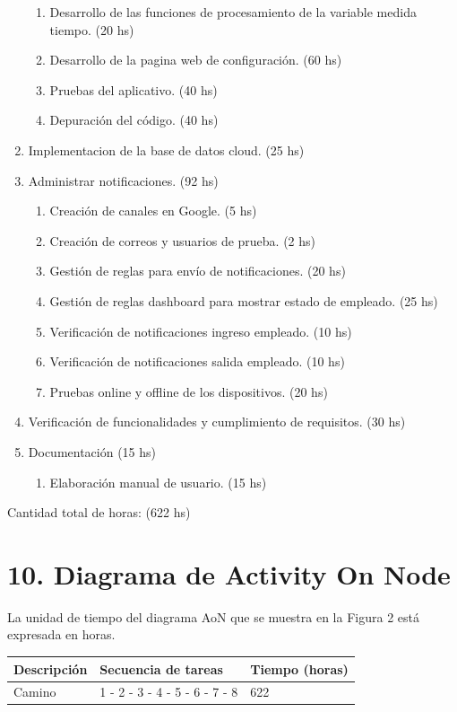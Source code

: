 \documentclass[
11pt, %
]{charter}
\begin{document}
\begin{enumerate}
\begin{enumerate}
	\item Desarrollo de las funciones de procesamiento de la variable medida tiempo. (20 hs)
	\item Desarrollo de la pagina web de configuración. (60 hs)
	\item Pruebas del aplicativo. (40 hs)
	\item Depuración del código. (40 hs)
	\end{enumerate}
\item Implementacion de la base de datos cloud. (25 hs)
\item Administrar notificaciones. (92 hs)
	\begin{enumerate}
	\item Creación de canales en Google. (5 hs)
	\item Creación de correos y usuarios de prueba. (2 hs)
	\item Gestión de reglas para envío de notificaciones. (20 hs)
	\item Gestión de reglas dashboard para mostrar estado de empleado. (25 hs)
	\item Verificación de notificaciones ingreso empleado. (10 hs)
	\item Verificación de notificaciones salida empleado. (10 hs)
	\item Pruebas online y offline de los dispositivos. (20 hs)
	\end{enumerate}
\item Verificación de funcionalidades y cumplimiento de requisitos. (30 hs)
\item Documentación (15 hs)
	\begin{enumerate}
	\item Elaboración manual de usuario. (15 hs)
	\end{enumerate}
\end{enumerate}
Cantidad total de horas: (622 hs)


\section{10. Diagrama de Activity On Node}
\label{sec:AoN}

La unidad de tiempo del diagrama AoN que se muestra en la Figura 2 está expresada en horas.

\begin{table}[H]
 \begin{tabular}{|l|l|l|}
\hline
\rowcolor[HTML]{C0C0C0} 
\textbf{Descripción} & \textbf{Secuencia de tareas} & \textbf{Tiempo (horas)} \\ \hline
Camino & 1 - 2 - 3 - 4 - 5 - 6 - 7 - 8 & 622	\\ \hline

\end{tabular}
\end{table}
\end{document}
